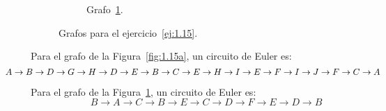 \begin{ejercicio}
\begin{figure}
\begin{subfigure}[b]{0.4\textwidth}
            \caption{Grafo~\ref{fig:1.15b}.}
            \label{fig:1.15b}
        \end{subfigure}
        
        \caption{Grafos para el ejercicio~\ref{ej:1.15}.}
        \label{fig:1.15}
    \end{figure}

    Para el grafo de la Figura~\ref{fig:1.15a}, un circuito de Euler es:
    \begin{equation*}
        \hspace{-3em}
        A\to B\to D\to G\to H\to D\to E\to B\to C\to E\to H\to I\to E\to F\to I\to J\to F\to C\to A
    \end{equation*}

    Para el grafo de la Figura~\ref{fig:1.15b}, un circuito de Euler es:
    \begin{equation*}
        B\to A\to C\to B\to E\to C\to D\to F\to E\to D\to B
    \end{equation*}
\end{ejercicio}



